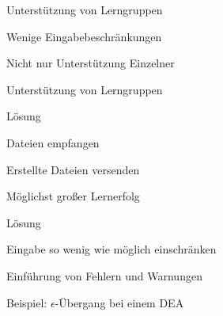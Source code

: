 



{
    \begin{itemgroup}{}
	\item Unterstützung von Lerngruppen
	\item Wenige Eingabebeschränkungen
	\end{itemgroup}

    \vfill{}
}


{
    \begin{itemgroup}{}
	\item Nicht nur Unterstützung Einzelner
	\item Unterstützung von Lerngruppen
    \end{itemgroup}

    \begin{itemgroup}{Lösung}
	\item Dateien empfangen
	\item Erstellte Dateien versenden
	\end{itemgroup}
    
    \vfill{}
}


{
    \begin{itemgroup}{}
	\item Möglichst großer Lernerfolg
    \end{itemgroup}

    \begin{itemgroup}{Lösung}
	\item Eingabe so wenig wie möglich einschränken
	\item Einführung von Fehlern und Warnungen
	\item Beispiel: $\epsilon$-Übergang bei einem DEA
	\end{itemgroup}
    
    \vfill{}
}


